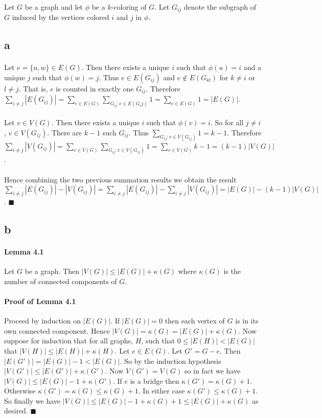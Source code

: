 \documentclass[letterpaper,12pt,oneside,onecolumn]{report}
\begin{document}
\paragraph{}
Let $G$ be a graph and let $\phi$ be a $k$-coloring of $G$. Let $G_{ij}$ denote the subgraph of $G$ induced by the vertices colored $i$ and $j$ in $\phi$.
\subsection*{a}
\paragraph{}
Let $e = \{u,w\} \in E(G)$. Then there exists a unique $i$ such that $\phi(u) = i$ and a unique $j$ such that $\phi(w) = j$. Thus $e \in E(G_{ij})$ and $e \not\in E(G_{kl})$ for $k \neq i$ or $l \neq j$. That is, $e$ is counted in exactly one $G_{ij}$. Therefore $\sum_{i \neq j} |E(G_{ij})| = \sum_{e \in E(G)} \sum_{G_{ij}: e \in E(G_ij)} 1 = \sum_{e \in E(G)} 1 = |E(G)|$.
\paragraph{}
Let $v \in V(G)$. Then there exists a unique $i$ such that $\phi(v) = i$. So for all $j\neq i$, $v \in V(G_{ij})$. There are $k-1$ such $G_{ij}$. Thus $\sum_{G_{ij}: v \in V(G_{ij})} 1 = k-1$. Therefore $\sum_{i\neq j} |V(G_{ij})| = \sum_{v \in V(G)} \sum_{G_{ij} : v \in V(G_{ij})} 1 = \sum_{v \in V(G)} k-1 = (k-1)|V(G)|$.
\paragraph{}
Hence combining the two previous summation results we obtain the result $\sum_{i\neq j}|E(G_{ij})| - |V(G_{ij})| = \sum_{i\neq j} |E(G_{ij})| - \sum_{i\neq j} |V(G_{ij})| = |E(G)| - (k-1)|V(G)|$. $\blacksquare$
\subsection*{b}
\paragraph{Lemma 4.1}
Let $G$ be a graph. Then $|V(G)| \leq |E(G)| + \kappa(G)$ where $\kappa(G)$ is the number of connected components of $G$.
\paragraph{Proof of Lemma 4.1}
Proceed by induction on $|E(G)|$. If $|E(G)| = 0$ then each vertex of $G$ is in its own connected component. Hence $|V(G)| = \kappa(G) = |E(G)| + \kappa(G)$. Now suppose for induction that for all graphs, $H$, such that $0 \leq |E(H)| < |E(G)|$ that $|V(H)| \leq |E(H)| + \kappa(H)$. Let $e \in E(G)$. Let $G' = G - e$. Then $|E(G')| = |E(G)| - 1 < |E(G)|$. So by the induction hypothesis $|V(G')| \leq |E(G')| + \kappa(G')$. Now $V(G') = V(G)$ so in fact we have $|V(G)| \leq |E(G)| - 1 + \kappa(G')$. If $e$ is a bridge then $\kappa(G') = \kappa(G) + 1$. Otherwise $\kappa(G') = \kappa(G) \leq \kappa(G) + 1$. In either case $\kappa(G') \leq \kappa(G) + 1$. So finally we have $|V(G)| \leq |E(G)| -1 + \kappa(G) + 1 \leq |E(G)| + \kappa(G)$ as desired. $\blacksquare$ 
\end{document}
